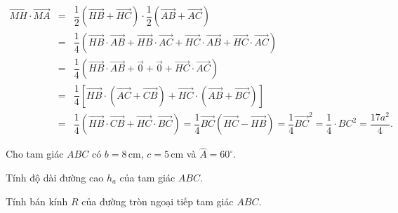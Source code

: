\begin{bt}
{\begin{eqnarray*}
    \vec{MH}\cdot\vec{MA}&=&\dfrac{1}{2} \left(\vec{HB}+\vec{HC}\right)\cdot \dfrac{1}{2} \left(\vec{AB}+\vec{AC}\right)\\
    &=&\dfrac{1}{4}\left(\vec{HB}\cdot \vec{AB}+\vec{HB}\cdot \vec{AC}+\vec{HC}\cdot \vec{AB}+\vec{HC}\cdot \vec{AC}\right)\\
    &=& \dfrac{1}{4}\left(\vec{HB}\cdot \vec{AB}+\vec{0}+\vec{0}+\vec{HC}\cdot \vec{AC}\right)\\
    &=&\dfrac{1}{4}\left[\vec{HB}\cdot\left(\vec{AC}+\vec{CB}\right)+\vec{HC}\cdot\left(\vec{AB}+\vec{BC}\right)\right]\\
    &=&\dfrac{1}{4}\left(\vec{HB}\cdot \vec{CB}+\vec{HC}\cdot \vec{BC}\right)=\dfrac{1}{4}\vec{BC}\left(\vec{HC}-\vec{HB}\right)=\dfrac{1}{4}\vec{BC}^2=\dfrac{1}{4}\cdot BC^2=\dfrac{17a^2}{4}.
\end{eqnarray*}
}
\end{bt}

\begin{bt}%
    Cho tam giác $ABC$ có $b=8 \mathrm{\,cm}$, $c=5 \mathrm{\,cm}$ và $\widehat{A}=60^{\circ}$.
    \begin{listEX}
        \item Tính độ dài đường cao $h_a$ của tam giác $ABC$.
        \item Tính bán kính $R$ của đường tròn ngoại tiếp tam giác $ABC$.
    \end{listEX}
 
\end{bt}

